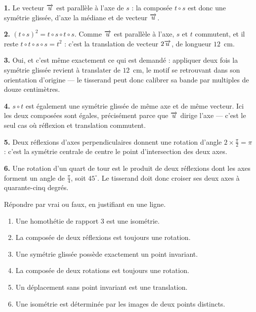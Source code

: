 \begin{corrige}
\textbf{1.} Le vecteur $\overrightarrow{u}$ est parallèle à l'axe de $s$ : la composée
$t \circ s$ est donc une symétrie glissée, d'axe la médiane et de vecteur
$\overrightarrow{u}$.

\textbf{2.} $(t \circ s)^{2} = t \circ s \circ t \circ s$. Comme $\overrightarrow{u}$ est
parallèle à l'axe, $s$ et $t$ commutent, et il reste
$t \circ t \circ s \circ s = t^{2}$ : c'est la translation de vecteur
$2\overrightarrow{u}$, de longueur $12$~cm.

\textbf{3.} Oui, et c'est même exactement ce qui est demandé : appliquer deux
fois la symétrie glissée revient à translater de $12$~cm, le motif se
retrouvant dans son orientation d'origine — le tisserand peut donc calibrer
sa bande par multiples de douze centimètres.

\textbf{4.} $s \circ t$ est également une symétrie glissée de même axe et de
même vecteur. Ici les deux composées sont égales, précisément parce que
$\overrightarrow{u}$ dirige l'axe — c'est le seul cas où réflexion et translation
commutent.

\textbf{5.} Deux réflexions d'axes perpendiculaires donnent une rotation
d'angle $2 \times \frac{\pi}{2} = \pi$ : c'est la symétrie centrale de centre
le point d'intersection des deux axes.

\textbf{6.} Une rotation d'un quart de tour est le produit de deux réflexions
dont les axes forment un angle de $\frac{\pi}{4}$, soit $45^{\circ}$. Le
tisserand doit donc croiser ses deux axes à quarante-cinq degrés.
\end{corrige}

\begin{jemeteste}
Répondre par vrai ou faux, en justifiant en une ligne.

\begin{enumerate}[label=\textbf{\arabic*.}, leftmargin=*, itemsep=0.28em]
  \item Une homothétie de rapport $3$ est une isométrie.
  \item La composée de deux réflexions est toujours une rotation.
  \item Une symétrie glissée possède exactement un point invariant.
  \item La composée de deux rotations est toujours une rotation.
  \item Un déplacement sans point invariant est une translation.
  \item Une isométrie est déterminée par les images de deux points distincts.
\end{enumerate}
\end{jemeteste}

